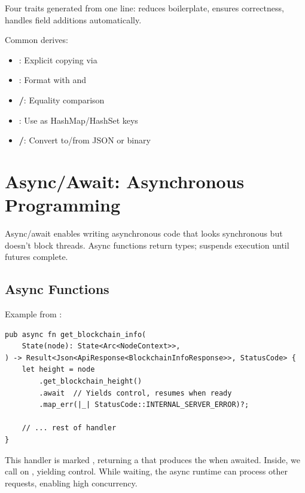 Four traits generated from one line: reduces boilerplate, ensures correctness, handles field additions automatically.

Common derives:
\begin{itemize}
  \item \textbf{}: Explicit copying via 
  \item \textbf{}: Format with  and 
  \item \textbf{/}: Equality comparison
  \item \textbf{}: Use as HashMap/HashSet keys
  \item \textbf{/}: Convert to/from JSON or binary
\end{itemize}

\section{Async/Await: Asynchronous Programming}
\label{sec:ch24-async-await}

Async/await enables writing asynchronous code that looks synchronous but doesn't block threads. Async functions return  types;  suspends execution until futures complete.

\subsection{Async Functions}
\label{subsec:ch24-async-func}

Example from :

\begin{listing}[htbp]
\caption{Async function for blockchain info retrieval}
\label{lst:ch24-async-func}
\begin{verbatim}
pub async fn get_blockchain_info(
    State(node): State<Arc<NodeContext>>,
) -> Result<Json<ApiResponse<BlockchainInfoResponse>>, StatusCode> {
    let height = node
        .get_blockchain_height()
        .await  // Yields control, resumes when ready
        .map_err(|_| StatusCode::INTERNAL_SERVER_ERROR)?;

    // ... rest of handler
}
\end{verbatim}
\end{listing}

This handler is marked , returning a  that produces the  when awaited. Inside, we call  on , yielding control. While waiting, the async runtime can process other requests, enabling high concurrency.

